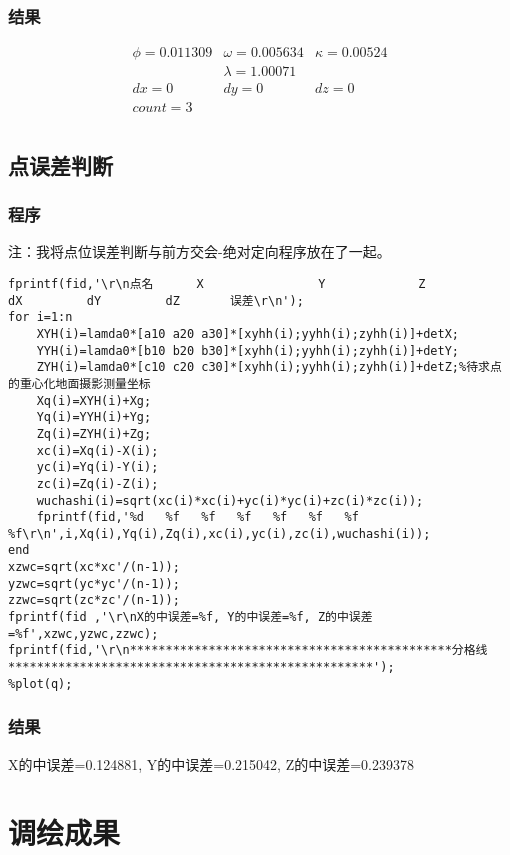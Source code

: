 \subsubsection{结果}
\begin{equation}
\begin{array}{lll}
\phi=0.011309 & \omega=0.005634 & \kappa=0.00524 \\
& \lambda=1.00071& \\
dx=0 & dy=0 & dz=0  \\
count=3\\
\end{array}
\end{equation}

\subsection{点误差判断}
\subsubsection{程序}

注：我将点位误差判断与前方交会-绝对定向程序放在了一起。
\begin{lstlisting}
fprintf(fid,'\r\n点名      X                Y             Z             dX         dY         dZ       误差\r\n');
for i=1:n
    XYH(i)=lamda0*[a10 a20 a30]*[xyhh(i);yyhh(i);zyhh(i)]+detX;
    YYH(i)=lamda0*[b10 b20 b30]*[xyhh(i);yyhh(i);zyhh(i)]+detY;
    ZYH(i)=lamda0*[c10 c20 c30]*[xyhh(i);yyhh(i);zyhh(i)]+detZ;%待求点的重心化地面摄影测量坐标
    Xq(i)=XYH(i)+Xg;
    Yq(i)=YYH(i)+Yg;
    Zq(i)=ZYH(i)+Zg;
    xc(i)=Xq(i)-X(i);
    yc(i)=Yq(i)-Y(i);
    zc(i)=Zq(i)-Z(i);
    wuchashi(i)=sqrt(xc(i)*xc(i)+yc(i)*yc(i)+zc(i)*zc(i));
    fprintf(fid,'%d   %f   %f   %f   %f   %f   %f   %f\r\n',i,Xq(i),Yq(i),Zq(i),xc(i),yc(i),zc(i),wuchashi(i));
end
xzwc=sqrt(xc*xc'/(n-1));
yzwc=sqrt(yc*yc'/(n-1));
zzwc=sqrt(zc*zc'/(n-1));
fprintf(fid ,'\r\nX的中误差=%f, Y的中误差=%f, Z的中误差=%f',xzwc,yzwc,zzwc);
fprintf(fid,'\r\n*********************************************分格线***************************************************');
%plot(q);
\end{lstlisting}

\subsubsection{结果}
X的中误差=0.124881, Y的中误差=0.215042, Z的中误差=0.239378

\section{调绘成果}

